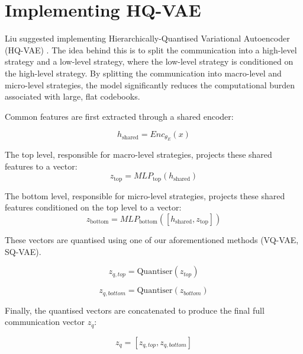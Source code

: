 \label{sec:hq-vae}


\section{Implementing HQ-VAE}
\label{sec:hq-1}

Liu \cite{AIMotherTongue} suggested implementing Hierarchically-Quantised Variational Autoencoder (HQ-VAE) \cite{HQVAE}.
The idea behind this is to split the communication into a high-level strategy and a low-level strategy, where the low-level strategy is conditioned on the high-level strategy.
By splitting the communication into macro-level and micro-level strategies, the model significantly reduces the computational burden associated with large, flat codebooks.

Common features are first extracted through a shared encoder:

\begin{equation}
    h_{\text{shared}} = Enc_{\theta_E}(x)
\end{equation}

The top level, responsible for macro-level strategies, projects these shared features to a vector:
\begin{equation}
    z_{\text{top}} = MLP_{\text{top}}(h_{\text{shared}})
\end{equation}

The bottom level, responsible for micro-level strategies, projects these shared features conditioned on the top level to a vector:
\begin{equation}
    z_{\text{bottom}} = MLP_{\text{bottom}}([h_{\text{shared}}, z_{\text{top}}])
\end{equation}

These vectors are quantised using one of our aforementioned methods (VQ-VAE, SQ-VAE).

\begin{equation}
    z_{q, top} = \text{Quantiser}(z_{top})
\end{equation}

\begin{equation}
    z_{q, bottom} = \text{Quantiser}(z_{bottom})
\end{equation}

Finally, the quantised vectors are concatenated to produce the final full communication vector $z_q$:

\begin{equation}
    z_q = [z_{q, top}, z_{q, bottom}]
\end{equation}


